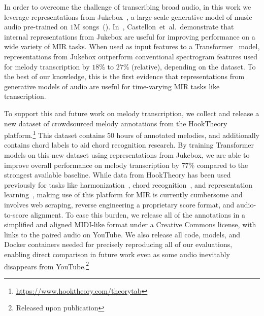 \documentclass{article}
\newcommand{\hooktheory}{HookTheory}
\begin{document}
In order to overcome the challenge of transcribing broad audio, in this work we leverage representations from Jukebox~\cite{dhariwal2020jukebox}, a large-scale generative model of music audio pre-trained on $1$M songs~(). 
In~\cite{castellon2021calm}, Castellon~et~al.\ demonstrate that internal representations from Jukebox are useful for improving performance on a wide variety of MIR tasks. 
When used as input features to a Transformer~\cite{vaswani2017attention} model, representations from Jukebox outperform conventional spectrogram features used for melody transcription by 
$18$\% to $27$\% (relative), 
depending on the dataset. 
To the best of our knowledge, this is the first evidence that representations from generative models of audio are useful for time-varying MIR tasks like transcription.

To support this and future work on melody transcription, we collect and release a new dataset of crowdsourced melody annotations from the \hooktheory{} platform.\footnote{\url{https://www.hooktheory.com/theorytab}} 
This dataset contains $50$ hours of annotated melodies, and additionally contains chord labels to aid chord recognition research. 
By training Transformer models on this new dataset using representations from Jukebox, we are able to improve overall performance on melody transcription by 
$77$\% 
compared to the strongest available baseline. 
While data from \hooktheory{} has been used previously for tasks like harmonization~\cite{chen2021surprisenet,yeh2021automatic}, chord recognition~\cite{jiang2019mirex}, and representation learning~\cite{jiang2020transformer}, making use of this platform for MIR is currently cumbersome and involves web scraping, reverse engineering a proprietary score format, and audio-to-score alignment. 
To ease this burden, we release all of the annotations in a simplified and aligned MIDI-like format under a Creative Commons license, with links to the paired audio on YouTube. 
We also release all code, models, and Docker containers needed for precisely reproducing all of our evaluations, enabling direct comparison in future work even as some audio inevitably disappears from YouTube.\footnote{Released upon publication}
\end{document}
